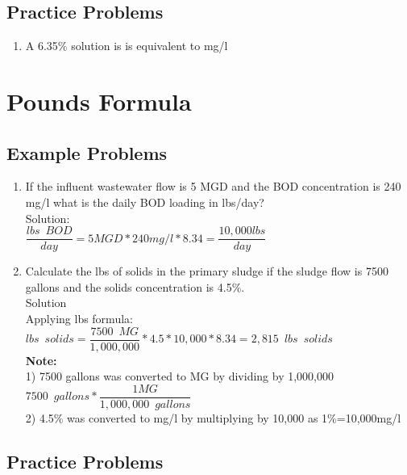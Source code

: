 \subsection{Practice Problems} 

\begin{enumerate}
\item A 6.35\% solution is is equivalent to {\underline{\hspace{1cm}}} mg/l\\
\end{enumerate}

\newpage
\section{Pounds Formula}
\subsection{Example Problems} 
\begin{enumerate}
\item If the influent wastewater flow is 5 MGD and the BOD concentration is 240 mg/l what is the daily BOD loading in lbs/day?\\
Solution:\\
$\dfrac{lbs \enspace BOD}{day}=5MGD*240mg/l*8.34=\boxed{\dfrac{10,000lbs}{day}}$\\

\item Calculate the lbs of solids in the primary sludge if the sludge flow is 7500 gallons and the solids concentration is 4.5\%.\\
Solution\\
Applying lbs formula:\\
$lbs \enspace solids = \dfrac{7500 \enspace MG}{1,000,000} * 4.5*10,000 *8.34 = \boxed{2,815 \enspace lbs \enspace solids}$\\
\textbf{Note:}\\  
1) 7500 gallons was converted to MG by dividing by 1,000,000\\
$7500 \enspace gallons * \dfrac{1 MG}{1,000,000 \enspace gallons}$\\
2) 4.5\% was converted to mg/l by multiplying by 10,000 as 1\%=10,000mg/l

\end{enumerate}

\subsection{Practice Problems} 

